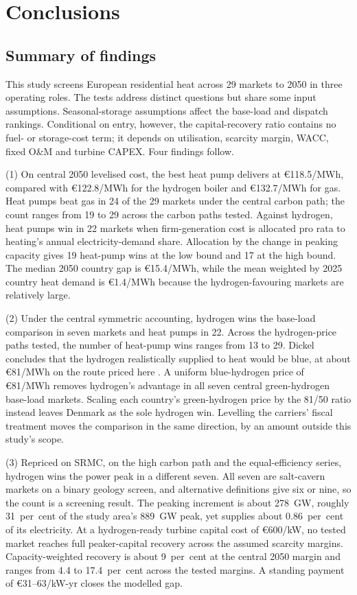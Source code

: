 \section{Conclusions}
\label{sec:conclusions}

\subsection{Summary of findings}

This study screens European residential heat across 29 markets to 2050 in three operating roles. The tests address distinct questions but share some input assumptions. Seasonal-storage assumptions affect the base-load and dispatch rankings. Conditional on entry, however, the capital-recovery ratio contains no fuel- or storage-cost term; it depends on utilisation, scarcity margin, WACC, fixed O\&M and turbine CAPEX. Four findings follow.

(1) On central 2050 levelised cost, the best heat pump delivers at \euro{}118.5/MWh,
compared with \euro{}122.8/MWh for the hydrogen boiler and \euro{}132.7/MWh for gas. Heat
pumps beat gas in 24 of the 29 markets under the central carbon path; the count ranges
from 19 to 29 across the carbon paths tested. Against hydrogen, heat pumps win in 22
markets when firm-generation cost is allocated pro rata to heating's annual
electricity-demand share. Allocation by the change in peaking capacity gives 19 heat-pump
wins at the low bound and 17 at the high bound. The median 2050 country gap is
\euro{}15.4/MWh, while the mean weighted by 2025 country heat demand is \euro{}1.4/MWh
because the hydrogen-favouring markets are relatively large.

(2) Under the central symmetric accounting, hydrogen wins the base-load comparison in
seven markets and heat pumps in 22. Across the hydrogen-price paths tested, the number of
heat-pump wins ranges from 13 to 29. Dickel \citep{Dickel2024ET29} concludes that the
hydrogen realistically supplied to heat would be blue, at about \euro{}81/MWh on the route
priced here \citep{IEAGHG2022blue}. A uniform blue-hydrogen price of \euro{}81/MWh removes
hydrogen's advantage in all seven central green-hydrogen base-load markets. Scaling each
country's green-hydrogen price by the 81/50 ratio instead leaves Denmark as the sole
hydrogen win. Levelling the carriers' fiscal treatment moves the comparison in the same
direction, by an amount outside this study's scope.

(3) Repriced on SRMC, on the high carbon path and the equal-efficiency
series, hydrogen wins the power peak in a different seven. All seven are salt-cavern markets on a binary geology screen, and alternative definitions give six or nine, so the count is a screening result. The
peaking increment is about 278~GW, roughly 31~per~cent of the study area's 889~GW peak, yet supplies about
0.86~per~cent of its electricity. At a hydrogen-ready turbine capital cost of \euro{}600/kW, no tested market reaches full
peaker-capital recovery across the assumed scarcity margins. Capacity-weighted recovery is
about 9~per~cent at the central 2050 margin and ranges from 4.4 to 17.4~per~cent across
the tested margins. A standing payment of \euro{}31--63/kW-yr closes the modelled gap.


